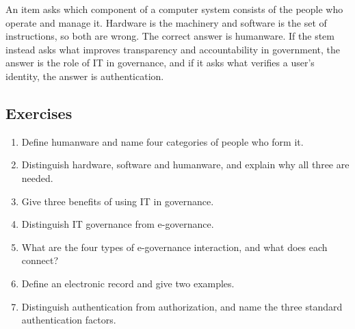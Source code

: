 \begin{example}
An item asks which component of a computer system consists of the people who
operate and manage it. Hardware is the machinery and software is the set of
instructions, so both are wrong. The correct answer is humanware. If the stem
instead asks what improves transparency and accountability in government, the
answer is the role of IT in governance, and if it asks what verifies a user's
identity, the answer is authentication.
\end{example}

\subsection*{Exercises}
\begin{enumerate}[label=\arabic*.]
  \item Define humanware and name four categories of people who form it.
  \item Distinguish hardware, software and humanware, and explain why all
    three are needed.
  \item Give three benefits of using IT in governance.
  \item Distinguish IT governance from e-governance.
  \item What are the four types of e-governance interaction, and what does
    each connect?
  \item Define an electronic record and give two examples.
  \item Distinguish authentication from authorization, and name the three
    standard authentication factors.
\end{enumerate}

